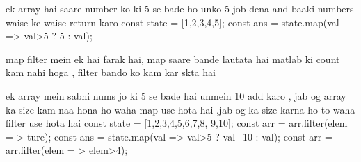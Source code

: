 ek array hai saare number ko ki 5 se bade ho unko 5 job dena and baaki numbers waise ke waise return karo 
const state = [1,2,3,4,5];
const ans = state.map(val => val>5 ? 5 : val);

map filter mein ek hai farak hai, map saare bande lautata hai matlab ki count kam nahi hoga , filter bando ko kam kar skta hai

ek array mein sabhi nums jo ki 5 se bade hai unmein 10 add karo , jab og array ka size kam naa hona ho waha map use hota hai ,jab og ka size karna ho to waha filter use hota hai 
const state = [1,2,3,4,5,6,7,8,
9,10];
const arr = arr.filter(elem = > ture);
const ans = state.map(val => val>5 ? val+10 : val);
const arr = arr.filter(elem = > elem>4);